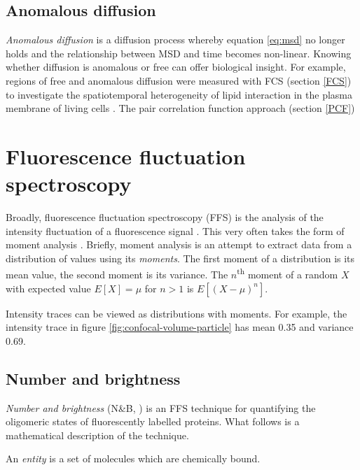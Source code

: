 \documentclass[12pt,]{book}
\theoremstyle{definition}
\theoremstyle{definition}
\theoremstyle{definition}
\theoremstyle{remark}
\let\BeginKnitrBlock\begin \let\EndKnitrBlock\end
\begin{document}
\subsection{Anomalous diffusion}\label{anomalous-diffusion}

\emph{Anomalous diffusion} is a diffusion process whereby equation
\eqref{eq:msd} no longer holds and the relationship between MSD and time
becomes non-linear. Knowing whether diffusion is anomalous or free can
offer biological insight. For example, regions of free and anomalous
diffusion were measured with FCS (section \ref{FCS}) to investigate the
spatiotemporal heterogeneity of lipid interaction in the plasma membrane
of living cells \citep{EggSTEDFCS}. The pair correlation function
approach (section \ref{PCF})

\section{Fluorescence fluctuation spectroscopy}\label{FFS}

Broadly, fluorescence fluctuation spectroscopy (FFS) is the analysis of
the intensity fluctuation of a fluorescence signal \citep{FFS}. This
very often takes the form of moment analysis \citep{QianElson}. Briefly,
moment analysis is an attempt to extract data from a distribution of
values using its \emph{moments}. The first moment of a distribution is
its mean value, the second moment is its variance. The
\(n\)\textsuperscript{th} moment of a random \(X\) with expected value
\(E[X]=\mu\) for \(n>1\) is \(E[(X - \mu)^n]\).

Intensity traces can be viewed as distributions with moments. For
example, the intensity trace in figure
\ref{fig:confocal-volume-particle} has mean 0.35 and variance 0.69.

\subsection{Number and brightness}\label{number-and-brightness}

\emph{Number and brightness} (N\&B, \citet{NB}) is an FFS technique for
quantifying the oligomeric states of fluorescently labelled proteins.
What follows is a mathematical description of the technique.

\BeginKnitrBlock{definition}
\protect\hypertarget{def:unnamed-chunk-13}{}{\label{def:unnamed-chunk-13}
}An \emph{entity} is a set of molecules which are chemically bound.
\EndKnitrBlock{definition}
\end{document}
